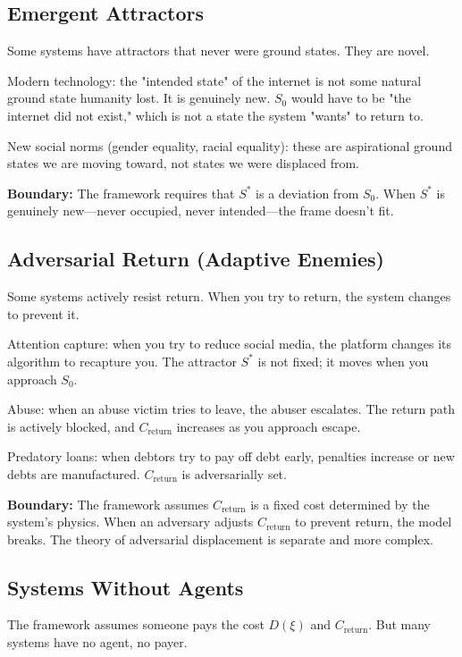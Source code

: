 \documentclass[12pt]{article}
\begin{document}
\subsection{Emergent Attractors}

Some systems have attractors that never were ground states. They are novel.

Modern technology: the "intended state" of the internet is not some natural ground state humanity lost. It is genuinely new. $S_0$ would have to be "the internet did not exist," which is not a state the system "wants" to return to.

New social norms (gender equality, racial equality): these are aspirational ground states we are moving toward, not states we were displaced from.

\textbf{Boundary:} The framework requires that $S^*$ is a deviation from $S_0$. When $S^*$ is genuinely new—never occupied, never intended—the frame doesn't fit.

\subsection{Adversarial Return (Adaptive Enemies)}

Some systems actively resist return. When you try to return, the system changes to prevent it.

Attention capture: when you try to reduce social media, the platform changes its algorithm to recapture you. The attractor $S^*$ is not fixed; it moves when you approach $S_0$.

Abuse: when an abuse victim tries to leave, the abuser escalates. The return path is actively blocked, and $C_{\text{return}}$ increases as you approach escape.

Predatory loans: when debtors try to pay off debt early, penalties increase or new debts are manufactured. $C_{\text{return}}$ is adversarially set.

\textbf{Boundary:} The framework assumes $C_{\text{return}}$ is a fixed cost determined by the system's physics. When an adversary adjusts $C_{\text{return}}$ to prevent return, the model breaks. The theory of adversarial displacement is separate and more complex.

\subsection{Systems Without Agents}

The framework assumes someone pays the cost $D(\xi)$ and $C_{\text{return}}$. But many systems have no agent, no payer.
\end{document}
